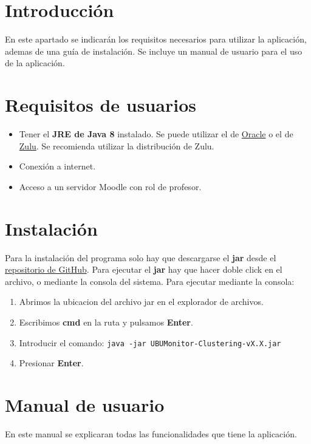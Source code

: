 
\section{Introducción}
En este apartado se indicarán los requisitos necesarios para utilizar la aplicación, ademas de una guía de instalación. Se incluye un manual de usuario para el uso de la aplicación.

\section{Requisitos de usuarios}
\begin{itemize}
	\item Tener el \textbf{JRE de Java 8} instalado. Se puede utilizar el de \href{https://www.java.com/es/download/}{Oracle} o el de \href{https://www.azul.com/downloads/zulu-community/?version=java-8-lts&os=windows&architecture=x86-64-bit&package=jre}{Zulu}. Se recomienda utilizar la distribución de Zulu.
	\item Conexión a internet.
	\item Acceso a un servidor Moodle con rol de profesor.
\end{itemize}
\section{Instalación}
Para la instalación del programa solo hay que descargarse el \textbf{jar} desde el \href{https://github.com/xjx1001/UBUMonitor/releases/latest}{repositorio de GitHub}.
Para ejecutar el \textbf{jar} hay que hacer doble click en el archivo, o mediante la consola del sistema. Para ejecutar mediante la consola:
\begin{enumerate}
	\item Abrimos la ubicacion del archivo jar en el explorador de archivos.
	\item Escribimos \textbf{cmd} en la ruta y pulsamos \textbf{Enter}.
	\item Introducir el comando: \texttt{java -jar UBUMonitor-Clustering-vX.X.jar}
	\item Presionar \textbf{Enter}.
\end{enumerate}

\section{Manual de usuario}
En este manual se explicaran todas las funcionalidades que tiene la aplicación.

